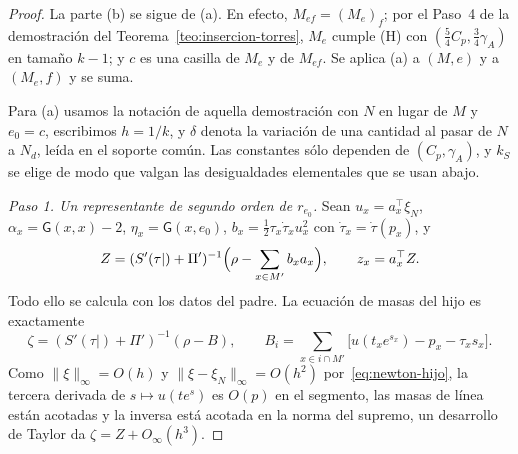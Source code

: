 \begin{proof}
La parte (b) se sigue de (a). En efecto, $M_{ef}=(M_e)_f$; por el Paso~4 de la demostración del
Teorema~\ref{teo:insercion-torres}, $M_e$ cumple \textup{(H)} con $(\tfrac54C_p,\tfrac34\gamma_A)$ en
tamaño $k-1$; y $c$ es una casilla de $M_e$ y de $M_{ef}$. Se aplica (a) a $(M,e)$ y a $(M_e,f)$ y se
suma.

Para (a) usamos la notación de aquella demostración con $N$ en lugar de $M$ y $e_0=c$, escribimos
$h=1/k$, y $\delta$ denota la variación de una cantidad al pasar de $N$ a $N_d$, leída en el soporte
común. Las constantes sólo dependen de $(C_p,\gamma_A)$, y $k_S$ se elige de modo que valgan las
desigualdades elementales que se usan abajo.

\emph{Paso 1. Un representante de segundo orden de $r_{e_0}$.} Sean $u_x=a_x^\top\xi_N$,
$\alpha_x=\mathsf G(x,x)-2$, $\eta_x=\mathsf G(x,e_0)$, $b_x=\tfrac12\tau_x\dot\tau_xu_x^2$ con
$\dot\tau_x=\dot\tau(p_x)$, y
\[
 Z=(S'(\tau|)+\Pi')^{-1}\Bigl(\rho-\sum_{x\in M'}b_xa_x\Bigr),\qquad z_x=a_x^\top Z .
\]
Todo ello se calcula con los datos del padre. La ecuación de masas del hijo es exactamente
\begin{equation}\label{eq:masas-hijo}
 \zeta=(S'(\tau|)+\Pi')^{-1}(\rho-B),\qquad
 B_i=\sum_{x\in i\cap M'}\bigl[u(t_xe^{s_x})-p_x-\tau_xs_x\bigr].
\end{equation}
Como $\|\xi\|_\infty=O(h)$ y $\|\xi-\xi_N\|_\infty=O(h^2)$ por~\eqref{eq:newton-hijo}, la tercera
derivada de $s\mapsto u(te^s)$ es $O(p)$ en el segmento, las masas de línea están acotadas y la inversa
está acotada en la norma del supremo, un desarrollo de Taylor da $\zeta=Z+O_\infty(h^3)$.


\end{proof}
